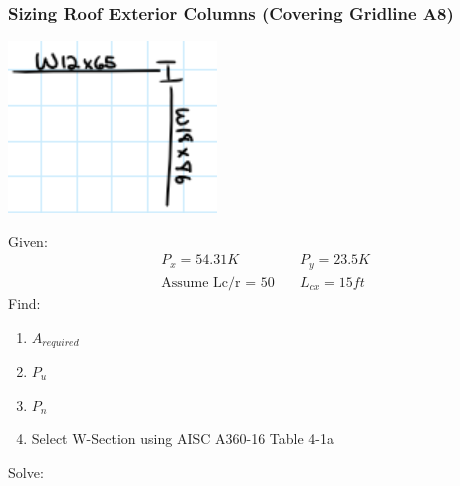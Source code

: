 \documentclass{report} %
\begin{document}
\newpage
\subsubsection*{Sizing Roof Exterior Columns (Covering Gridline A8)}
\begin{center}
    \includegraphics[scale=1.25]{RoofColumn_A8}
\end{center}
Given:
\begin{equation*}
    \begin{aligned}
        &P_x = 54.31K \quad &P_y = 23.5K \\
        &\text{Assume Lc/r = 50} \quad &L_{cx} = 15ft
    \end{aligned}
\end{equation*}
Find:
\begin{enumerate}
    \item $A_{required}$
    \item $P_u$
    \item $P_n$
    \item Select W-Section using AISC A360-16 Table 4-1a
\end{enumerate}
Solve:
\end{document}

